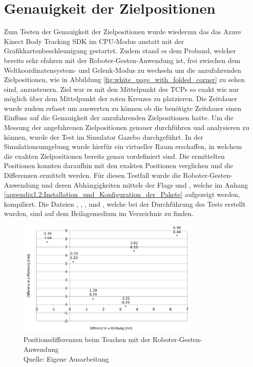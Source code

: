 \section{Genauigkeit der Zielpositionen}
Zum Testen der Genauigkeit der Zielpositionen wurde wiederum das das Azure Kinect Body Tracking SDK im CPU-Modus anstatt mit der Grafikkartenbeschleunigung gestartet. Zudem stand es dem Proband, welcher bereits sehr efahren mit der Roboter-Gesten-Anwendung ist, frei zwischen dem Weltkoordinatensystem- und Gelenk-Modus zu wechseln um die anzufahrenden Zielpositionen, wie in Abbildung \ref{fig:white_page_with_folded_corner} zu sehen sind, anzusteuern. Ziel war es mit den Mittelpunkt des TCPs so exakt wie nur möglich über dem Mittelpunkt der roten Kreuzes zu platzieren. Die Zeitdauer wurde zudem erfasst um auswerten zu können ob die benötigte Zeitdauer einen Einfluss auf die Genauigkeit der anzufahrenden Zielpositionen hatte. Um die Messung der angefahrenen Zielpositionen genauer durchführen und analysieren zu können, wurde der Test im Simulator Gazebo durchgeführt. In der Simulationsumgebung wurde hierfür ein virtueller Raum erschaffen, in welchem die exakten Zielpositionen bereits genau vordefiniert sind. Die ermittelten Positionen konnten daraufhin mit den exakten Positionen verglichen und die Differenzen ermittelt werden. Für diesen Testfall wurde die Roboter-Gesten-Anwendung und deren Abhängigkeiten mittels der Flags  und , welche im Anhang \ref{appendix1.2:Installation_und_Konfiguration_der_Pakete} aufgezeigt werden, kompiliert. Die Dateien , , ,   und , welche bei der Durchführung des Tests erstellt wurden, sind auf dem Beilagemedium im Verzeichnis  zu finden.

\begin{figure}[htb]
	\centering
	\includegraphics[width=0.808\textwidth]{images/ergebnisse/Differenzen_beim_Teachen_mit_Gesten}
	\caption[Positionsdifferenzen beim Teachen mit der Roboter-Gesten-Anwendung]{Positionsdifferenzen beim Teachen mit der Roboter-Gesten-Anwendung\\Quelle: Eigene Ausarbeitung}
	\label{fig:measurement_teaching_positions_differences}
\end{figure}
\FloatBarrier

